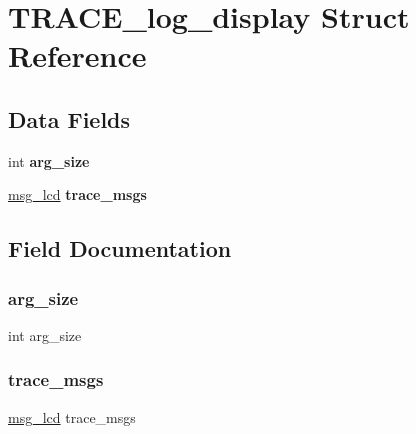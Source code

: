\hypertarget{struct_t_r_a_c_e__log__display}{}\section{T\+R\+A\+C\+E\+\_\+log\+\_\+display Struct Reference}
\label{struct_t_r_a_c_e__log__display}
\subsection*{Data Fields}
\begin{DoxyCompactItemize}
\item 
\hypertarget{struct_t_r_a_c_e__log__display_a711a6fa02335f49ddd69d7e64c8e74b5}{}\label{struct_t_r_a_c_e__log__display_a711a6fa02335f49ddd69d7e64c8e74b5} 
int {\bfseries arg\+\_\+size}
\item 
\hypertarget{struct_t_r_a_c_e__log__display_ae352c8d5925ee6d646efff5a13428dbd}{}\label{struct_t_r_a_c_e__log__display_ae352c8d5925ee6d646efff5a13428dbd} 
\hyperlink{struct__msg__lcd}{msg\+\_\+lcd} {\bfseries trace\+\_\+msgs}
\end{DoxyCompactItemize}


\subsection{Field Documentation}
\hypertarget{struct_t_r_a_c_e__log__display_a711a6fa02335f49ddd69d7e64c8e74b5}{}\label{struct_t_r_a_c_e__log__display_a711a6fa02335f49ddd69d7e64c8e74b5} 
\subsubsection{\texorpdfstring{arg\+\_\+size}{arg\_size}}
{\footnotesize\ttfamily int arg\+\_\+size}

\hypertarget{struct_t_r_a_c_e__log__display_ae352c8d5925ee6d646efff5a13428dbd}{}\label{struct_t_r_a_c_e__log__display_ae352c8d5925ee6d646efff5a13428dbd} 
\subsubsection{\texorpdfstring{trace\+\_\+msgs}{trace\_msgs}}
{\footnotesize\ttfamily \hyperlink{struct__msg__lcd}{msg\+\_\+lcd} trace\+\_\+msgs}

